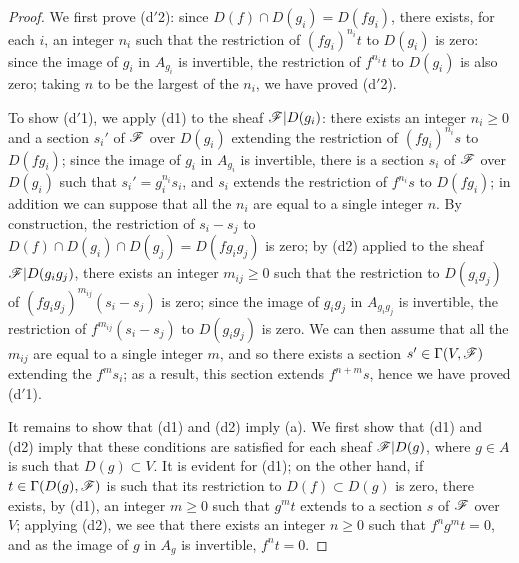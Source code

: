 \begin{proof}
We first prove (d$'$2): since $D(f)\cap D(g_i)=D(fg_i)$, there exists, for each $i$, an integer $n_i$ such that the restriction of $(fg_i)^{n_i}t$ to $D(g_i)$ is zero:
since the image of $g_i$ in $A_{g_i}$ is invertible, the restriction of $f^{n_i}t$ to $D(g_i)$ is also zero;
taking $n$ to be the largest of the $n_i$, we have proved (d$'$2).

To show (d$'$1), we apply (d1) to the sheaf $\mathscr{F}|D(g_i)$: there exists an integer $n_i\geqslant 0$ and a section $s_i'$ of $\mathscr{F}$ over $D(g_i)$ extending the restriction of $(fg_i)^{n_i}s$ to $D(fg_i)$;
since the image of $g_i$ in $A_{g_i}$ is invertible, there is a section $s_i$ of $\mathscr{F}$ over $D(g_i)$ such that $s_i'=g_i^{n_i}s_i$, and $s_i$ extends the
restriction of $f^{n_i}s$ to $D(fg_i)$;
in addition we can suppose that all the $n_i$ are equal to a single integer $n$.
By construction, the restriction of $s_i-s_j$ to $D(f)\cap D(g_i)\cap D(g_j)=D(fg_i g_j)$ is zero;
by (d2) applied to the sheaf $\mathscr{F}|D(g_i g_j)$, there exists an integer $m_{ij}\geqslant 0$ such that the restriction to $D(g_i g_j)$ of $(fg_i g_j)^{m_{ij}}(s_i-s_j)$ is zero;
since the image of $g_i g_j$ in $A_{g_i g_j}$ is invertible, the restriction of $f^{m_{ij}}(s_i-s_j)$ to $D(g_i g_j)$ is zero.
We can then assume that all the $m_{ij}$ are equal to a single integer $m$, and so there exists a section $s'\in\Gamma(V,\mathscr{F})$ extending the $f^m s_i$;
as a result, this section extends $f^{n+m}s$, hence we have proved (d$'$1).

It remains to show that (d1) and (d2) imply (a).
We first show that (d1) and (d2) imply that these conditions are satisfied for each sheaf $\mathscr{F}|D(g)$, where $g\in A$ is such that $D(g)\subset V$.
It is evident for (d1);
on the other hand, if $t\in\Gamma(D(g),\mathscr{F})$ is such that its restriction to $D(f)\subset D(g)$ is zero, there exists, by (d1), an integer $m\geqslant 0$ such that $g^m t$
extends to a section $s$ of $\mathscr{F}$ over $V$;
applying (d2), we see that there exists an integer $n\geqslant 0$ such that $f^n g^m t=0$, and as the image of $g$ in $A_g$ is invertible, $f^n t=0$.


\end{proof}
